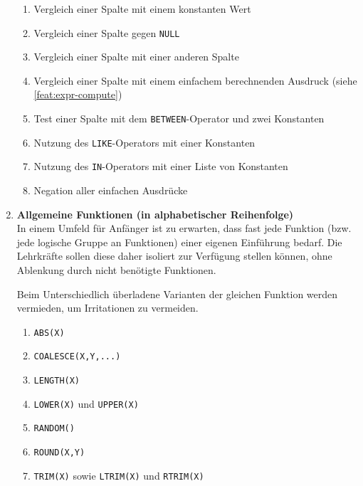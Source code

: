 \begin{enumerate}
  \begin{enumerate}
  \item \label{feat:expr-compare-const} Vergleich einer Spalte mit einem konstanten Wert
  \item \label{feat:expr-compare-null} Vergleich einer Spalte gegen \texttt{NULL}
  \item \label{feat:expr-compare-other-col} Vergleich einer Spalte mit einer anderen Spalte
  \item \label{feat:expr-compare-simple-func} Vergleich einer Spalte mit einem einfachem berechnenden Ausdruck (siehe \ref{feat:expr-compute})
  \item \label{feat:expr-compare-between} Test einer Spalte mit dem \texttt{BETWEEN}-Operator und zwei Konstanten
  \item \label{feat:expr-compare-like} Nutzung des \texttt{LIKE}-Operators mit einer Konstanten
  \item \label{feat:expr-compare-in} Nutzung des \texttt{IN}-Operators mit einer Liste von Konstanten
  \item \label{feat:expr-compare-negate} Negation aller einfachen Ausdrücke
  \end{enumerate}

\item \textbf{Allgemeine Funktionen (in alphabetischer Reihenfolge)} \\
  In einem Umfeld für Anfänger ist zu erwarten, dass fast jede Funktion (bzw. jede logische Gruppe an Funktionen) einer eigenen Einführung bedarf. Die Lehrkräfte sollen diese daher isoliert zur Verfügung stellen können, ohne Ablenkung durch nicht benötigte Funktionen.

  Beim Unterschiedlich überladene Varianten der gleichen Funktion werden vermieden, um Irritationen zu vermeiden.
  \begin{enumerate}
  \item \label{feat:fun-abs} \texttt{ABS(X)}
  \item \label{feat:fun-coalesce} \texttt{COALESCE(X,Y,...)}
  \item \label{feat:fun-length} \texttt{LENGTH(X)}
  \item \label{feat:fun-casing} \texttt{LOWER(X)} und \texttt{UPPER(X)}
  \item \label{feat:fun-random} \texttt{RANDOM()}
  \item \label{feat:fun-round} \texttt{ROUND(X,Y)}
  \item \label{feat:fun-trim} \texttt{TRIM(X)} sowie \texttt{LTRIM(X)} und \texttt{RTRIM(X)}
  \end{enumerate}


\end{enumerate}
